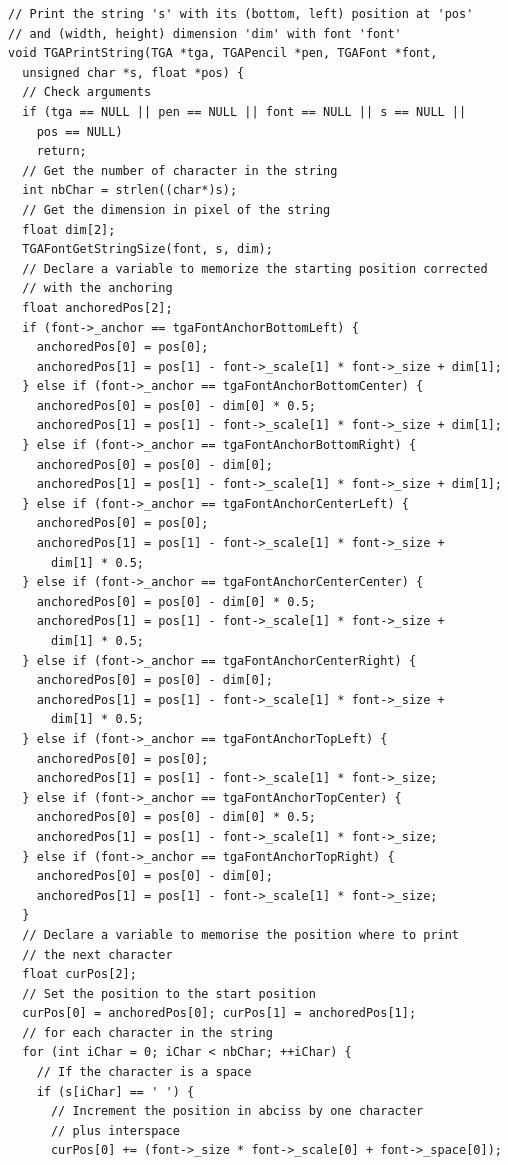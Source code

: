 \documentclass[12pt, a4paper]{article}
\begin{document}
\begin{scriptsize}
\begin{ttfamily}
\begin{lstlisting}
// Print the string 's' with its (bottom, left) position at 'pos'
// and (width, height) dimension 'dim' with font 'font'
void TGAPrintString(TGA *tga, TGAPencil *pen, TGAFont *font, 
  unsigned char *s, float *pos) {
  // Check arguments
  if (tga == NULL || pen == NULL || font == NULL || s == NULL ||
    pos == NULL)
    return;
  // Get the number of character in the string
  int nbChar = strlen((char*)s);
  // Get the dimension in pixel of the string
  float dim[2];
  TGAFontGetStringSize(font, s, dim);
  // Declare a variable to memorize the starting position corrected
  // with the anchoring
  float anchoredPos[2];
  if (font->_anchor == tgaFontAnchorBottomLeft) {
    anchoredPos[0] = pos[0];
    anchoredPos[1] = pos[1] - font->_scale[1] * font->_size + dim[1];
  } else if (font->_anchor == tgaFontAnchorBottomCenter) {
    anchoredPos[0] = pos[0] - dim[0] * 0.5;
    anchoredPos[1] = pos[1] - font->_scale[1] * font->_size + dim[1];
  } else if (font->_anchor == tgaFontAnchorBottomRight) {
    anchoredPos[0] = pos[0] - dim[0];
    anchoredPos[1] = pos[1] - font->_scale[1] * font->_size + dim[1];
  } else if (font->_anchor == tgaFontAnchorCenterLeft) {
    anchoredPos[0] = pos[0];
    anchoredPos[1] = pos[1] - font->_scale[1] * font->_size + 
      dim[1] * 0.5;
  } else if (font->_anchor == tgaFontAnchorCenterCenter) {
    anchoredPos[0] = pos[0] - dim[0] * 0.5;
    anchoredPos[1] = pos[1] - font->_scale[1] * font->_size + 
      dim[1] * 0.5;
  } else if (font->_anchor == tgaFontAnchorCenterRight) {
    anchoredPos[0] = pos[0] - dim[0];
    anchoredPos[1] = pos[1] - font->_scale[1] * font->_size + 
      dim[1] * 0.5;
  } else if (font->_anchor == tgaFontAnchorTopLeft) {
    anchoredPos[0] = pos[0];
    anchoredPos[1] = pos[1] - font->_scale[1] * font->_size;
  } else if (font->_anchor == tgaFontAnchorTopCenter) {
    anchoredPos[0] = pos[0] - dim[0] * 0.5;
    anchoredPos[1] = pos[1] - font->_scale[1] * font->_size;
  } else if (font->_anchor == tgaFontAnchorTopRight) {
    anchoredPos[0] = pos[0] - dim[0];
    anchoredPos[1] = pos[1] - font->_scale[1] * font->_size;
  }
  // Declare a variable to memorise the position where to print 
  // the next character
  float curPos[2];
  // Set the position to the start position
  curPos[0] = anchoredPos[0]; curPos[1] = anchoredPos[1]; 
  // for each character in the string
  for (int iChar = 0; iChar < nbChar; ++iChar) {
    // If the character is a space
    if (s[iChar] == ' ') {
      // Increment the position in abciss by one character 
      // plus interspace
      curPos[0] += (font->_size * font->_scale[0] + font->_space[0]);

\end{lstlisting}
\end{ttfamily}
\end{scriptsize}
\end{document}
